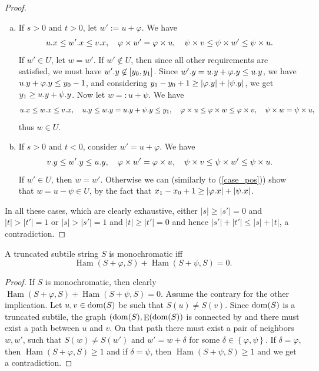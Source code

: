\documentclass[twoside,leqno]{article}
\renewcommand{\phi}{\varphi}
\newcommand{\set}[1]{\left\lbrace #1 \right\rbrace}
\newcommand{\eq}[1]{\begin{align*} #1 \end{align*}}
\DeclareMathOperator*{\Edges}{E}
\DeclareMathOperator*{\Ham}{Ham}
\newcommand{\absolute}[1]{\left\lvert#1\right\rvert}
\begin{document}
\begin{lemma}
\begin{proof}
\begin{enumerate}[(a)]
			\item If $s > 0$ and $t > 0$, let $w' := u + \phi$. \label{case_pos}
				We have \eq{
					\x{u} \le \x{w'} \le \x{v}, \quad \h{w'} = \h{u}, \quad \s{v} \le \s{w'} \le \s{u}.
				}
				If $w' \in U$, let $w = w'$.
				If $w' \not \in U$, then since all other requirements are satisfied, we must have $w'.y \not \in [y_0, y_1]$.
				Since $\y{w'} = \y{u} + \y{\phi} \le \y{u}$, we have $\y{u} + \y{\phi} \le y_0 - 1$, and
				considering $y_1 - y_0 + 1 \ge \absolute{\y{\phi}} + \absolute{\y{\psi}}$, we get $y_1 \ge u.y + \psi.y$.
				Now let $w =: u + \psi$.
				We have \eq{
					\x{u} \le \x{w} \le \x{v}, \quad \y{u} \le \y{w} = \y{u} + \y{\psi} \le y_1, \quad \h{u} \le \h{w} \le \h{v}, \quad \s{w} = \s{u},
				}
				thus $w \in U$.
			\item If $s > 0$ and $t < 0$, consider $w' = u + \phi$.
				We have \eq{
					\y{v} \le \y{w'} \le \y{u}, \quad \h{w'} = \h{u}, \quad \s{v} \le \s{w'} \le \s{u}.
				}
				If $w' \in U$, then $w = w'$.
				Otherwise we can (similarly to (\ref{case_pos})) show that $w = u - \psi \in U$, by the fact that $x_1 - x_0 + 1 \ge \absolute{\x{\phi}} + \absolute{\x{\psi}}$. 
		\end{enumerate}
		In all these cases, which are clearly exhaustive, either $\absolute{s} \ge \absolute{s'} = 0$ and $\absolute{t} > \absolute{t'} = 1$ or $\absolute{s} > \absolute{s'} = 1$ and $\absolute{t} \ge \absolute{t'} = 0$ and hence $\absolute{s'}+\absolute{t'} \le \absolute{s}+\absolute{t}$, a contradiction. 
	\end{proof}
\end{lemma}




\begin{lemma}\label{monochromacy_condition}
	A truncated subtile string $S$ is monochromatic iff
	\[\Ham(S + \phi, S) + \Ham(S + \psi, S) = 0.\]
	\begin{proof}
		If $S$ is monochromatic, then clearly $\Ham(S + \phi, S) + \Ham(S + \psi, S) = 0$.
		Assume the contrary for the other implication.
		Let $u, v \in \operatorname*{dom}(S)$ be such that $S(u) \neq S(v)$.
		Since $\operatorname*{dom}(S)$ is a truncated subtile, the graph $(\d{S}, \Edges(\d{S})$ is connected by  and there must exist a path between $u$ and $v$.
		On that path there must exist a pair of neighbors $w, w'$, such that $S(w) \neq S(w')$ and $w' = w + \delta$ for some $\delta \in \set{\phi, \psi}$.
		If $\delta = \phi$, then $\Ham(S + \phi, S) \ge 1$ and if $\delta = \psi$, then $\Ham(S + \psi, S) \ge 1$ and we get a contradiction.
	\end{proof}
\end{lemma}
\end{document}
